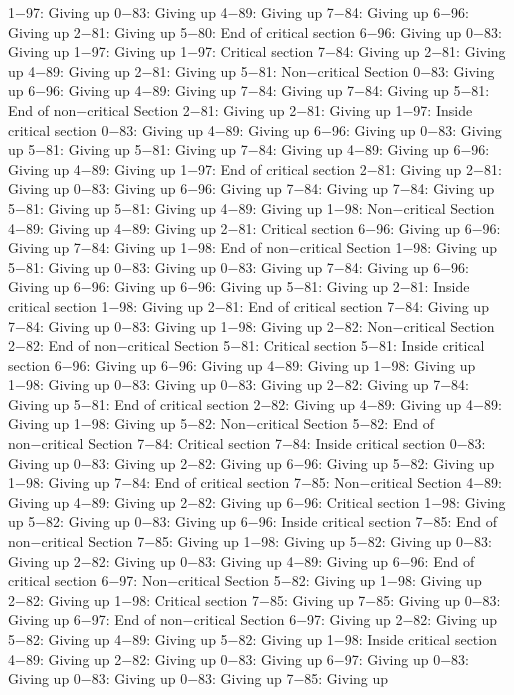 1−97: Giving up
0−83: Giving up
4−89: Giving up
7−84: Giving up
6−96: Giving up
2−81: Giving up
5−80: End of critical section
6−96: Giving up
0−83: Giving up
1−97: Giving up
1−97: Critical section
7−84: Giving up
2−81: Giving up
4−89: Giving up
2−81: Giving up
5−81: Non−critical Section
0−83: Giving up
6−96: Giving up
4−89: Giving up
7−84: Giving up
7−84: Giving up
5−81: End of non−critical Section
2−81: Giving up
2−81: Giving up
1−97: Inside critical section
0−83: Giving up
4−89: Giving up
6−96: Giving up
0−83: Giving up
5−81: Giving up
5−81: Giving up
7−84: Giving up
4−89: Giving up
6−96: Giving up
4−89: Giving up
1−97: End of critical section
2−81: Giving up
2−81: Giving up
0−83: Giving up
6−96: Giving up
7−84: Giving up
7−84: Giving up
5−81: Giving up
5−81: Giving up
4−89: Giving up
1−98: Non−critical Section
4−89: Giving up
4−89: Giving up
2−81: Critical section
6−96: Giving up
6−96: Giving up
7−84: Giving up
1−98: End of non−critical Section
1−98: Giving up
5−81: Giving up
0−83: Giving up
0−83: Giving up
7−84: Giving up
6−96: Giving up
6−96: Giving up
6−96: Giving up
5−81: Giving up
2−81: Inside critical section
1−98: Giving up
2−81: End of critical section
7−84: Giving up
7−84: Giving up
0−83: Giving up
1−98: Giving up
2−82: Non−critical Section
2−82: End of non−critical Section
5−81: Critical section
5−81: Inside critical section
6−96: Giving up
6−96: Giving up
4−89: Giving up
1−98: Giving up
1−98: Giving up
0−83: Giving up
0−83: Giving up
2−82: Giving up
7−84: Giving up
5−81: End of critical section
2−82: Giving up
4−89: Giving up
4−89: Giving up
1−98: Giving up
5−82: Non−critical Section
5−82: End of non−critical Section
7−84: Critical section
7−84: Inside critical section
0−83: Giving up
0−83: Giving up
2−82: Giving up
6−96: Giving up
5−82: Giving up
1−98: Giving up
7−84: End of critical section
7−85: Non−critical Section
4−89: Giving up
4−89: Giving up
2−82: Giving up
6−96: Critical section
1−98: Giving up
5−82: Giving up
0−83: Giving up
6−96: Inside critical section
7−85: End of non−critical Section
7−85: Giving up
1−98: Giving up
5−82: Giving up
0−83: Giving up
2−82: Giving up
0−83: Giving up
4−89: Giving up
6−96: End of critical section
6−97: Non−critical Section
5−82: Giving up
1−98: Giving up
2−82: Giving up
1−98: Critical section
7−85: Giving up
7−85: Giving up
0−83: Giving up
6−97: End of non−critical Section
6−97: Giving up
2−82: Giving up
5−82: Giving up
4−89: Giving up
5−82: Giving up
1−98: Inside critical section
4−89: Giving up
2−82: Giving up
0−83: Giving up
6−97: Giving up
0−83: Giving up
0−83: Giving up
0−83: Giving up
7−85: Giving up
